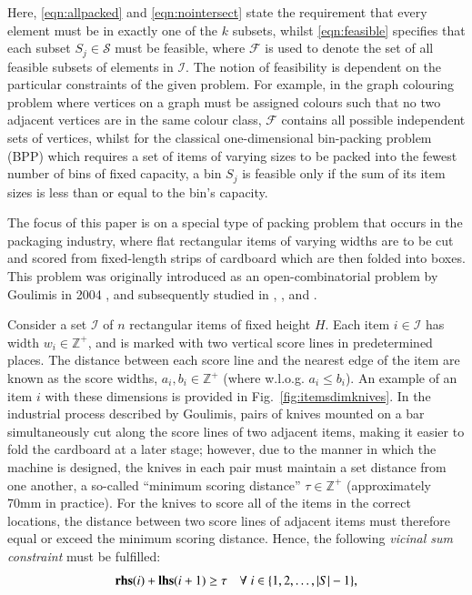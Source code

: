 \documentclass[a4paper,11pt,authoryear]{elsarticle}
\begin{document}
\noindent Here, \eqref{eqn:allpacked} and \eqref{eqn:nointersect} state the requirement that every element must be in exactly one of the $k$ subsets, whilst \eqref{eqn:feasible} specifies that each subset $S_j \in \mathcal{S}$ must be feasible, where $\mathcal{F}$ is used to denote the set of all feasible subsets of elements in $\mathcal{I}$. The notion of feasibility is dependent on the particular constraints of the given problem. For example, in the graph colouring problem where vertices on a graph must be assigned colours such that no two adjacent vertices are in the same colour class, $\mathcal{F}$ contains all possible independent sets of vertices, whilst for the classical one-dimensional bin-packing problem (BPP) which requires a set of items of varying sizes to be packed into the fewest number of bins of fixed capacity, a bin $S_j$ is feasible only if the sum of its item sizes is less than or equal to the bin's capacity.

The focus of this paper is on a special type of packing problem that occurs in the packaging industry, where flat rectangular items of varying widths are to be cut and scored from fixed-length strips of cardboard which are then folded into boxes. This problem was originally introduced as an open-combinatorial problem by Goulimis in 2004 \cite{goulimis2004}, and subsequently studied in \cite{lewis2011}, \cite{becker2015}, and \cite{hawa2018}.

Consider a set $\mathcal{I}$ of $n$ rectangular items of fixed height $H$. Each item $i \in \mathcal{I}$ has width $w_i \in \mathbb{Z}^+$, and is marked with two vertical score lines in predetermined places. The distance between each score line and the nearest edge of the item are known as the score widths, $a_i, b_i \in \mathbb{Z}^+$ (where w.l.o.g. $a_i \leq b_i$). An example of an item $i$ with these dimensions is provided in Fig.~\ref{fig:itemsdimknives}. In the industrial process described by Goulimis, pairs of knives mounted on a bar simultaneously cut along the score lines of two adjacent items, making it easier to fold the cardboard at a later stage; however, due to the manner in which the machine is designed, the knives in each pair must maintain a set distance from one another, a so-called ``minimum scoring distance'' $\tau \in \mathbb{Z}^+$ (approximately 70mm in practice). For the knives to score all of the items in the correct locations, the distance between two score lines of adjacent items must therefore equal or exceed the minimum scoring distance. Hence, the following \emph{vicinal sum constraint} must be fulfilled:
\begin{equation}
	\textbf{rhs}(i) + \textbf{lhs}(i+1) \geq \tau \quad \forall \hspace{1mm} i \in \{1,2,\dotsc,|S|- 1\},
	\label{eqn:vsc}
\end{equation}
\end{document}
